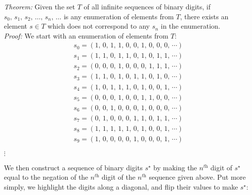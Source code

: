 \begin{center}
\begin{tcolorbox}[breakable,enhanced,colback=white,width=12cm,sharp corners,frame hidden]
	\textit{Theorem:} Given the set $T$ of all infinite sequences of binary digits, if $s_0,\,s_1,\,s_2,\,\dots,\,s_n,\,\dots$ is any enumeration of elements from $T$, there exists an element $s\in T$ which does not correspond to any $s_n$ in the enumeration. \\
	
	\textit{Proof:} We start with an enumeration of elements from $T$: \\
	\begin{align*}
		s_0=(1,\, 0,\, 1,\, 1,\, 0,\, 0,\, 1,\, 0,\, 0,\, 0,\, \cdots) \\
		s_1=(1,\, 1,\, 0,\, 1,\, 1,\, 0,\, 1,\, 0,\, 1,\, 1,\, \cdots) \\
		s_2=(0,\, 0,\, 0,\, 1,\, 0,\, 0,\, 0,\, 1,\, 1,\, 1,\, \cdots) \\
		s_3=(1,\, 1,\, 0,\, 1,\, 0,\, 1,\, 1,\, 0,\, 1,\, 0,\, \cdots) \\
		s_4=(1,\, 0,\, 1,\, 1,\, 1,\, 0,\, 1,\, 0,\, 0,\, 1,\, \cdots) \\
		s_5=(0,\, 0,\, 0,\, 1,\, 0,\, 0,\, 1,\, 1,\, 0,\, 0,\, \cdots) \\
		s_6=(0,\, 0,\, 1,\, 0,\, 0,\, 0,\, 1,\, 0,\, 0,\, 0,\, \cdots) \\
		s_7=(0,\, 1,\, 0,\, 0,\, 0,\, 1,\, 1,\, 0,\, 1,\, 1,\, \cdots) \\
		s_8=(1,\, 1,\, 1,\, 1,\, 1,\, 0,\, 1,\, 0,\, 0,\, 1,\, \cdots) \\
		s_9=(1,\, 0,\, 0,\, 0,\, 0,\, 1,\, 0,\, 0,\, 0,\, 1,\, \cdots)
	\end{align*}
	\begin{center}
		$\vdots$ \\
		\vspace{4mm}
	\end{center}
		
	We then construct a sequence of binary digits $s^\star$ by making the $n^\textit{th}$ digit of $s^\star$ equal to the negation of the $n^\textit{th}$ digit of the $n^\textit{th}$ sequence given above. Put more simply, we highlight the digits along a diagonal, and flip their values to make $s^\star$:
	

\end{tcolorbox}
\end{center}
